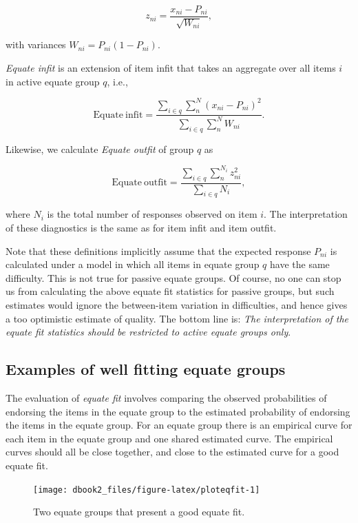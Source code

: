 \documentclass[
]{book}
\begin{document}
\[z_{ni} = \frac{x_{ni}-P_{ni}}{\sqrt{W_{ni}}},\]

with variances \(W_{ni} = P_{ni}(1-P_{ni})\).

\emph{Equate infit} is an extension of item infit that takes an aggregate over all items \(i\) in active equate group \(q\), i.e.,

\[\mathrm{Equate\ infit} = \frac{\sum_{i\in q}\sum_{n}^N (x_{ni}-P_{ni})^2}{\sum_{i\in q}\sum_n^N W_{ni}}.\]

Likewise, we calculate \emph{Equate outfit} of group \(q\) as

\[\mathrm{Equate\ outfit} = \frac{\sum_{i\in q}\sum_{n}^{N_i} z_{ni}^2}{\sum_{i\in q} N_i},\]

where \(N_i\) is the total number of responses observed on item \(i\). The interpretation of these diagnostics is the same as for item infit and item outfit.

Note that these definitions implicitly assume that the expected response \(P_{ni}\) is calculated under a model in which all items in equate group \(q\) have the same difficulty. This is not true for passive equate groups. Of course, no one can stop us from calculating the above equate fit statistics for passive groups, but such estimates would ignore the between-item variation in difficulties, and hence gives a too optimistic estimate of quality. The bottom line is: \emph{The interpretation of the equate fit statistics should be restricted to active equate groups only}.

\hypertarget{examples-of-well-fitting-equate-groups}{%
\subsection{Examples of well fitting equate groups}\label{examples-of-well-fitting-equate-groups}}

The evaluation of \emph{equate fit} involves comparing the observed probabilities of endorsing the items in the equate group to the estimated probability of endorsing the items in the equate group. For an equate group there is an empirical curve for each item in the equate group and one shared estimated curve. The empirical curves should all be close together, and close to the estimated curve for a good equate fit.

\begin{figure}

{\centering \texttt{[image: dbook2\_files/figure-latex/ploteqfit-1]} 

}

\caption{Two equate groups that present a good equate fit.}\label{fig:ploteqfit}
\end{figure}
\end{document}
